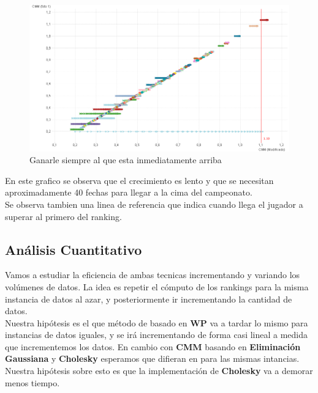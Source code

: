 \begin{figure}[H]
\centering
\includegraphics[width=1\textwidth]{IMG/estrategia 4.png}
\caption{Ganarle siempre al que esta inmediatamente arriba}
\label{fig:Ganarle siempre al que esta inmediatamente arriba}
\end{figure}

En este grafico se observa que el crecimiento es lento y que se necesitan aproximadamente 40 fechas para llegar a la cima del campeonato.\\

Se observa tambien una linea de referencia que indica cuando llega el jugador a superar al primero del ranking.\\




\subsection{Análisis Cuantitativo}


Vamos a estudiar la eficiencia de ambas tecnicas incrementando y variando los volúmenes de datos. La idea es repetir el cómputo de los rankings para la misma instancia de datos al azar, y posteriormente ir incrementando la cantidad de datos. \\

Nuestra hipótesis es el que método de basado en \textbf{WP} va a tardar lo mismo para instancias de datos iguales, y se irá incrementando de forma casi lineal a medida que incrementemos los datos. En cambio con \textbf{CMM} basando en \textbf{Eliminación Gaussiana} y \textbf{Cholesky} esperamos que difieran en para las mismas intancias. Nuestra hipótesis sobre esto es que la implementación de \textbf{Cholesky} va a demorar menos tiempo. \\

